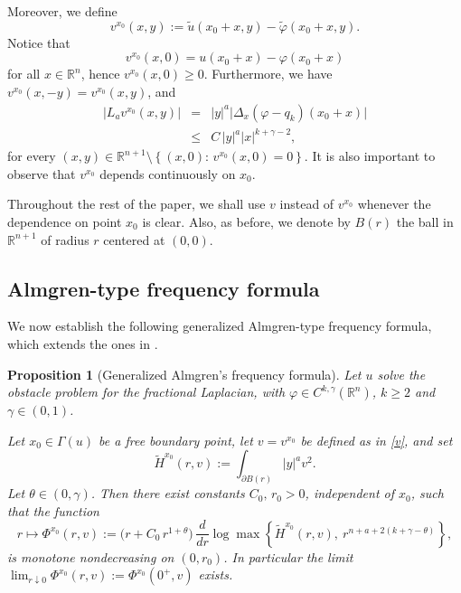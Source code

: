 \documentclass[11pt]{amsart}
\theoremstyle{plain}
\newtheorem{prop}[thrm]{Proposition}
\numberwithin{equation}{section}
\begin{document}
Moreover, we define
\begin{equation}\label{v}
v^{x_0}(x,y):=\widetilde{u}(x_0+x,y)-\tilde \varphi(x_0+x,y).
\end{equation}
Notice that
\[v^{x_0}(x,0)=u(x_0+x)-\varphi(x_0+x)\]
for all $x\in {\mathbb R}^n$, hence $v^{x_0}(x,0)\geq0$.
Furthermore, we have $v^{x_0}(x,-y)=v^{x_0}(x,y)$, and
\begin{eqnarray}\label{ext2}
|L_a v^{x_0}(x,y)|&=&|y|^{a}\bigl|\Delta_x(\varphi-q_k)(x_0+x)\bigr|\nonumber\\
&\leq& C\,|y|^{a}|x|^{k+\gamma-2},
\end{eqnarray}
for every $(x,y)\in \mathbb{R}^{n+1}\setminus\left\{(x,0):\, v^{x_0}(x,0)=0\right\}$.
It is also important to observe that $v^{x_0}$ depends continuously on $x_0$.

Throughout the rest of the paper, we shall use $v$ instead of $v^{x_0}$ whenever the dependence on point $x_0$ is clear.
Also, as before, we denote by ${B(r)}$ the ball in $\mathbb{R}^{n+1}$ of radius $r$ centered at $(0,0)$.

\subsection{Almgren-type frequency formula}

We now establish the following generalized Almgren-type frequency formula, which extends the ones in \cite{CSS,GP,BFR,CDS}.

\begin{prop}[Generalized Almgren's frequency formula]\label{Almgren}
Let $u$ solve the obstacle problem for the fractional Laplacian, with $\varphi\in C^{k,\gamma}({\mathbb R}^n)$,  $k\geq2$ and $\gamma\in(0,1)$.

Let $x_0\in \Gamma(u)$ be a free boundary point, let $v=v^{x_0}$ be defined as in \eqref{v},
and set
\begin{equation}\label{Hx_0}
\tilde{H}^{x_0}(r,v):=\int_{\partial {B(r)}}{|y|^{a}v^2 }.
\end{equation}
Let $\theta\in(0,\gamma)$.
Then there exist constants $C_0,\, r_0>0$, independent of $x_0$, such that the function
\begin{equation}\label{generalized-frequency}
r\mapsto \Phi^{x_0}(r,v):=\bigl(r+C_0\,r^{1+\theta}\bigr)\,\frac{d}{dr}\log \max\left\{\tilde{H}^{x_0}(r,v),\ r^{n+a+2(k+\gamma-\theta)}\right\},
\end{equation}
is monotone nondecreasing on $(0,r_0)$.
In particular the limit $\lim_{r\downarrow0}\Phi^{x_0}(r,v):=\Phi^{x_0}(0^+,v)$ exists.
\end{prop}
\end{document}
